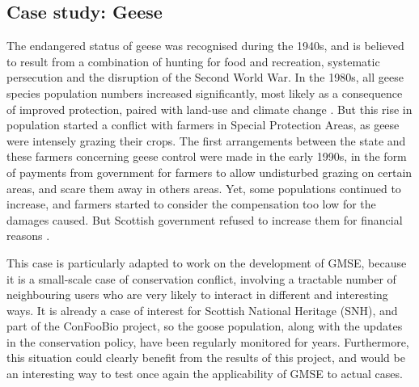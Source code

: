 \documentclass[12pt,a4paper]{article}
\begin{document}
\subsection{Case study: Geese}

The endangered status of geese was recognised during the 1940s, and is believed to result from a combination of hunting for food and recreation, systematic persecution and the disruption of the Second World War. %
In the 1980s, all geese species population numbers increased significantly, most likely as a consequence of improved protection, paired with land-use and climate change \citep{mason2017changing}.
But this rise in population started a conflict with farmers in Special Protection Areas, as geese were intensely grazing their crops.
The first arrangements between the state and these farmers concerning geese control were made in the early 1990s, in the form of payments from government for farmers to allow undisturbed grazing on certain areas, and scare them away in others areas.
Yet, some populations continued to increase, and farmers started to consider the compensation too low for the damages caused.
But Scottish government refused to increase them for financial reasons \citep{bainbridge2017goose}.

This case is particularly adapted to work on the development of GMSE, because it is a small-scale case of conservation conflict, involving a tractable number of neighbouring users who are very likely to interact in different and interesting ways.
It is already a case of interest for Scottish National Heritage (SNH), and part of the ConFooBio project, so the goose population, along with the updates in the conservation policy, have been regularly monitored for years.
Furthermore, this situation could clearly benefit from the results of this project, and would be an interesting way to test once again the applicability of GMSE to actual cases.
\end{document}
